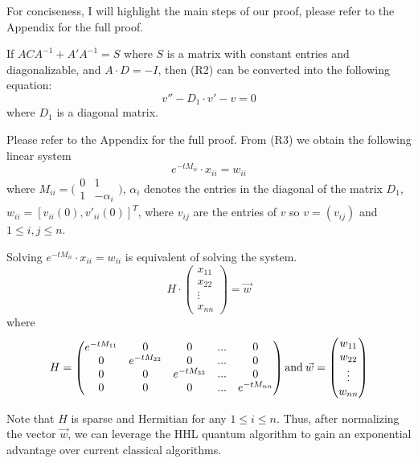 For conciseness, I will highlight the main steps of our proof, please refer to the Appendix for the full proof. 

\begin{theorem}
If $ACA^{-1} + A'A^{-1} = S$ where $S$ is a matrix with constant entries and diagonalizable, and $A \cdot D = -I$, then (R2) can be converted into the following equation:
    \begin{equation}
        \tag{R3}
        v'' - D_1 \cdot v' - v = 0
    \end{equation}
where $D_1$ is a diagonal matrix.
\end{theorem}


Please refer to the Appendix for the full proof. From (R3) we obtain the following linear system
\begin{equation}
    e^{-tM_{ii}} \cdot x_{ii} = w_{ii}
\end{equation}
where $M_{ii} = \big(\begin{smallmatrix}
      0 & 1\\
      1 & -\alpha_i
    \end{smallmatrix}\big)$, $\alpha_i$ denotes the entries in the diagonal of the matrix $D_1$, $w_{ii} = [v_{ii}(0), v'_{ii}(0)]^T$, where $v_{ij}$ are the entries of $v$ so $v = (v_{ij})$ and $1 \leq i,j \leq n$. 

Solving $e^{-tM_{ii}} \cdot x_{ii} = w_{ii}$ is equivalent of solving the system. 
\begin{equation*}
    H \cdot
    \begin{pmatrix}
        x_{11} \\
        x_{22} \\
        \vdots \\
        x_{nn}
    \end{pmatrix}
    = \Vec{w}
\end{equation*}
where 
\begin{equation*}
    H = \begin{pmatrix}
        e^{-tM_{11}} & 0 & 0 & ... & 0 \\
        0 & e^{-tM_{22}} & 0 & ... & 0 \\
        0 & 0 & e^{-tM_{33}} & ... & 0 \\
        0 & 0 & 0 & ... & e^{-tM_{nn}}
    \end{pmatrix}
    \text{and} \hspace{0.8mm} \Vec{w} = \begin{pmatrix}
        w_{11} \\
        w_{22} \\
        \vdots \\
        w_{nn}
    \end{pmatrix}
\end{equation*}

Note that $H$ is sparse and Hermitian for any $1 \leq i \leq n$. Thus, after normalizing the vector $\Vec{w}$, we can leverage the HHL quantum algorithm to gain an exponential advantage over current classical algorithms.
